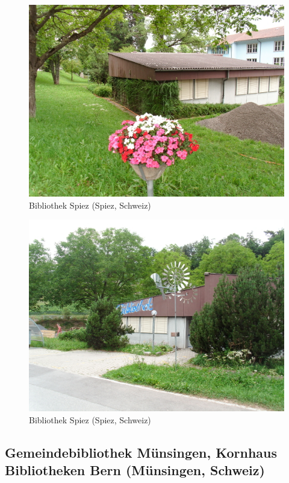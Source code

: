 \documentclass[a4paper,
fontsize=11pt,
oneside,
numbers=noperiodatend,
parskip=half-,
bibliography=totoc,
final
]{scrartcl}
\begin{document}
\begin{figure}[htbp]
\centering
\includegraphics{./img/061.jpg}
\caption{Bibliothek Spiez (Spiez,
Schweiz)}
\end{figure}

\begin{figure}[htbp]
\centering
\includegraphics{./img/062.jpg}
\caption{Bibliothek Spiez (Spiez,
Schweiz)}
\end{figure}

\subsection*{Gemeindebibliothek Münsingen, Kornhaus Bibliotheken Bern
(Münsingen,
Schweiz)}\label{gemeindebibliothek-muxfcnsingen-kornhaus-bibliotheken-bern-muxfcnsingen-schweiz}
\end{document}
